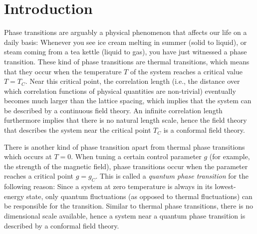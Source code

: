 \chapter{Introduction}

Phase transitions are arguably a physical phenomenon that affects our life on a daily basis: Whenever you see ice cream melting in summer (solid to liquid), or steam coming from a tea kettle (liquid to gas), you have just witnessed a phase transition. These kind of phase transitions are thermal transitions, which means that they occur when the temperature $T$ of the system reaches a critical value $T=T_C$. Near this critical point, the correlation length (i.e., the distance over which correlation functions of physical quantities are non-trivial) eventually becomes much larger than the lattice spacing, which implies that the system can be described by a continuous field theory. An infinite correlation length furthermore implies that there is no natural length scale, hence the field theory that describes the system near the critical point $T_C$ is a conformal field theory.

There is another kind of phase transition apart from thermal phase transitions which occurs at $T=0$. When tuning a certain control parameter $g$ (for example, the strength of the magnetic field), phase transitions occur when the parameter reaches a critical point $g=g_C$. This is called a \emph{quantum phase transition} for the following reason: Since a system at zero temperature is always in its lowest-energy state, only quantum fluctuations (as opposed to thermal fluctuations) can be responsible for the transition. Similar to thermal phase transitions, there is no dimensional scale available, hence a system near a quantum phase transition is described by a conformal field theory.

